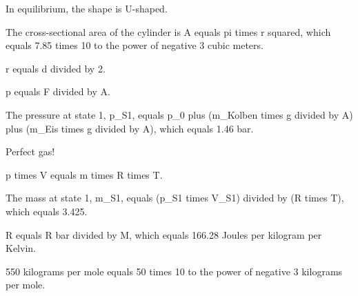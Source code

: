 In equilibrium, the shape is U-shaped.

The cross-sectional area of the cylinder is A equals pi times r squared, which equals 7.85 times 10 to the power of negative 3 cubic meters.

r equals d divided by 2.

p equals F divided by A.

The pressure at state 1, p_S1, equals p_0 plus (m_Kolben times g divided by A) plus (m_Eis times g divided by A), which equals 1.46 bar.

Perfect gas!

p times V equals m times R times T.

The mass at state 1, m_S1, equals (p_S1 times V_S1) divided by (R times T), which equals 3.425.

R equals R bar divided by M, which equals 166.28 Joules per kilogram per Kelvin.

550 kilograms per mole equals 50 times 10 to the power of negative 3 kilograms per mole.